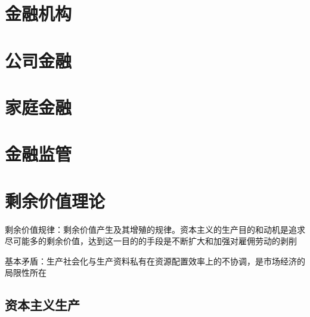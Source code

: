 \documentclass[12pt]{book}
\begin{document}
\chapter{金融机构}




\chapter{公司金融}




\chapter{家庭金融}


 






\chapter{金融监管}









\chapter{剩余价值理论}




剩余价值规律：剩余价值产生及其增殖的规律。资本主义的生产目的和动机是追求尽可能多的剩余价值，达到这一目的的手段是不断扩大和加强对雇佣劳动的剥削

基本矛盾：生产社会化与生产资料私有在资源配置效率上的不协调，是市场经济的局限性所在




\section{资本主义生产}

\end{document}
